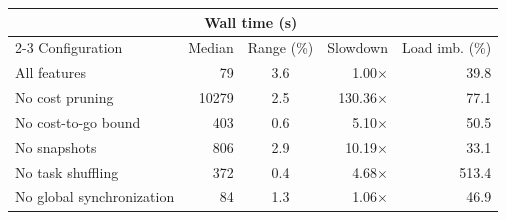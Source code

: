 \begin{tabular}{@{}l@{\quad}r@{\;}c@{\quad}r@{\quad}r@{}}
  \hline
   & \multicolumn{2}{c}{Wall time (s)} &  &  \\
  \cline{2-3}
  Configuration & Median & Range (\%) & Slowdown & Load imb. (\%) \\
  \hline
  All features & 79 & 3.6 & 1.00$\times$ & 39.8 \\
  No cost pruning & 10279 & 2.5 & 130.36$\times$ & 77.1 \\
  No cost-to-go bound & 403 & 0.6 & 5.10$\times$ & 50.5 \\
  No snapshots & 806 & 2.9 & 10.19$\times$ & 33.1 \\
  No task shuffling & 372 & 0.4 & 4.68$\times$ & 513.4 \\
  No global synchronization & 84 & 1.3 & 1.06$\times$ & 46.9 \\
  \hline
\end{tabular}
